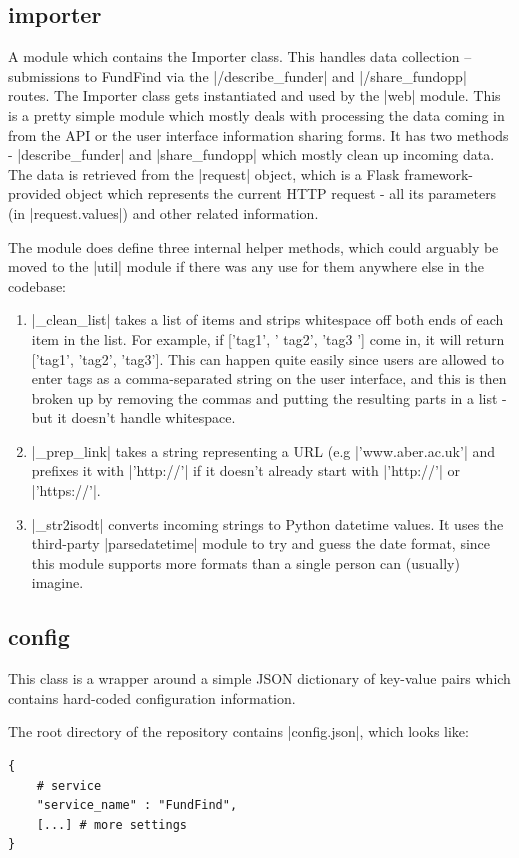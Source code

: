 \subsection{importer}
\label{design-importer}
A module which contains the Importer class. This handles data collection – submissions to FundFind via the |/describe_funder| and |/share_fundopp| routes. The Importer class gets instantiated and used by the |web| module. This is a pretty simple module which mostly deals with processing the data coming in from the API or the user interface information sharing forms. It has two methods - |describe_funder| and |share_fundopp| which mostly clean up incoming data. The data is retrieved from the |request| object, which is a Flask framework-provided object which represents the current HTTP request - all its parameters (in |request.values|) and other related information.

The module does define three internal helper methods, which could arguably be moved to the |util| module if there was any use for them anywhere else in the codebase:
\begin{enumerate}
 \item |_clean_list| takes a list of items and strips whitespace off both ends of each item in the list. For example, if ['tag1', ' tag2', 'tag3 '] come in, it will return ['tag1', 'tag2', 'tag3']. This can happen quite easily since users are allowed to enter tags as a comma-separated string on the user interface, and this is then broken up by removing the commas and putting the resulting parts in a list - but it doesn't handle whitespace.
 \item |_prep_link| takes a string representing a URL (e.g |'www.aber.ac.uk'| and prefixes it with |'http://'| if it doesn't already start with |'http://'| or |'https://'|.
 \item |_str2isodt| converts incoming strings to Python datetime values. It uses the third-party |parsedatetime| module to try and guess the date format, since this module supports more formats than a single person can (usually) imagine.
\end{enumerate}


\subsection{config}
This class is a wrapper around a simple JSON dictionary of key-value pairs which contains hard-coded configuration information.

The root directory of the repository contains |config.json|, which looks like:
\begin{verbatim}
{
    # service
    "service_name" : "FundFind",
    [...] # more settings
}
\end{verbatim}

